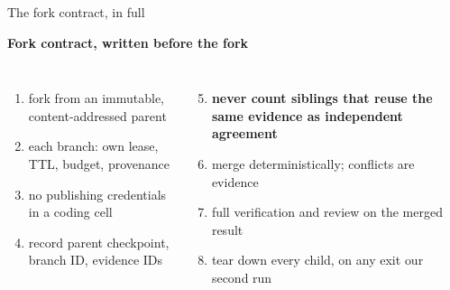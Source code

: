 \begin{frame}[t]{The fork contract, in full}
\vspace{0pt}
{\small\textbf{Fork contract, written before the fork}\par\vspace{2pt}
\begin{columns}[T,onlytextwidth]
\begin{enumerate}\setlength{\itemsep}{0pt}
\item fork from an immutable, content-addressed parent
\item each branch: own lease, TTL, budget, provenance
\item no publishing credentials in a coding cell
\item record parent checkpoint, branch ID, evidence IDs
\end{enumerate}
\begin{enumerate}\setcounter{enumi}{4}\setlength{\itemsep}{0pt}
\item {\color{Rust}\bfseries never count siblings that reuse the same evidence as independent agreement}
\item merge deterministically; conflicts are evidence
\item full verification and review on the merged result
\item tear down every child, on any exit \hfill{\color{Muted}our second run}
\end{enumerate}
\end{columns}\par}
\end{frame}
